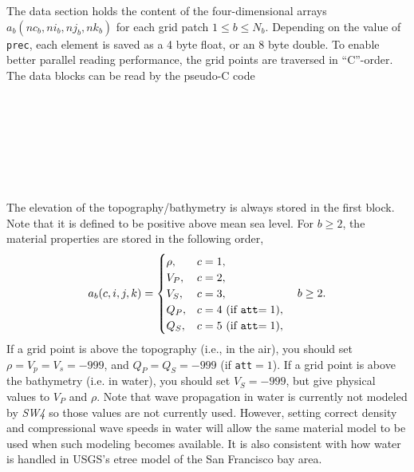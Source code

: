 \documentclass[11pt]{report}
\begin{document}
The data section holds the content of the four-dimensional arrays $a_b(nc_b,ni_b,nj_b,nk_b)$ for
each grid patch $1\leq b\leq N_b$. Depending on the value of {\tt prec}, each element is saved as a 4 byte
float, or an 8 byte double. To enable better parallel reading performance, the grid points are
traversed in ``C''-order. The data blocks can be read by the pseudo-C code
\begin{center}
\hspace{-35mm}{\tt for ($b=1$; $b\leq N_b$; $b$++) }\\ 
\hspace{-30mm}{\tt for ($i=1$; $i\leq ni_b$; $i$++) }\\ 
\hspace{-25mm}{\tt for ($j=1$; $j\leq nj_b$; $j$++) }\\ 
\hspace{-20mm}{\tt for ($k=1$; $k\leq nk_b$; $k$++) }\\ 
\hspace{-15mm}{\tt for ($c=1$; $c\leq nc_b$; $c$++) }\\
\hspace{-10mm}{\tt read $a_b(c,i,j,k)$}\\
\end{center}
The elevation of the topography/bathymetry is always stored in the first block. Note that it is
defined to be positive above mean sea level. For $b\geq 2$, the material properties are stored in
the following order,
\[
a_b(c,i,j,k) = \begin{cases}
\rho,&c=1,\\
V_P,& c=2,\\
V_S,& c=3,\\
Q_P,& c=4 \mbox{ (if {\tt att}$=1$)},\\
Q_S,& c=5 \mbox{ (if {\tt att}$=1$)},\\
\end{cases}\quad b\geq 2.
\]
If a grid point is above the topography (i.e., in the air), you should set $\rho=V_p=V_s=-999$, and
$Q_P=Q_S=-999$ (if {\tt att}$=1$). If a grid point is above the bathymetry (i.e. in water), you
should set $V_S=-999$, but give physical values to $V_P$ and $\rho$. Note that wave propagation in
water is currently not modeled by \emph{SW4} so those values are not currently used. However,
setting correct density and compressional wave speeds in water will allow the same material model to be
used when such modeling becomes available. It is also consistent with how water is handled in
USGS's etree model of the San Francisco bay area.
\end{document}
